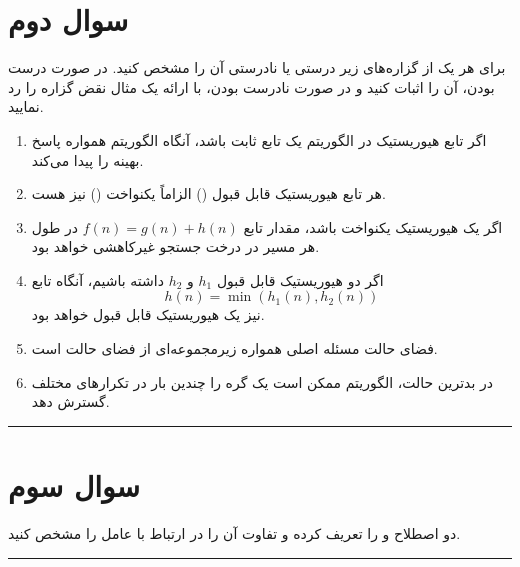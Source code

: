 \documentclass[a4paper,10pt]{article}
\begin{document}
\section{\textcolor{AccentGold}{سوال دوم}}

برای هر یک از گزاره‌های زیر درستی یا نادرستی آن را مشخص کنید.  
در صورت درست بودن، آن را اثبات کنید و در صورت نادرست بودن، با ارائه یک مثال نقض گزاره را رد نمایید.

\begin{enumerate}
	
	\item
	اگر تابع هیوریستیک در الگوریتم  یک تابع ثابت باشد، آنگاه الگوریتم همواره پاسخ بهینه را پیدا می‌کند.
	
	\item
	هر تابع هیوریستیک قابل قبول () الزاماً یکنواخت () نیز هست.
	
	\item
	اگر یک هیوریستیک یکنواخت باشد، مقدار تابع $f(n)=g(n)+h(n)$ در طول هر مسیر در درخت جستجو غیرکاهشی خواهد بود.
	
	\item
	اگر دو هیوریستیک قابل قبول $h_1$ و $h_2$ داشته باشیم، آنگاه تابع
	\[
	h(n)=\min(h_1(n),h_2(n))
	\]
	نیز یک هیوریستیک قابل قبول خواهد بود.
	
	\item
	فضای حالت مسئله اصلی همواره زیرمجموعه‌ای از فضای حالت  است.
	
	\item
	در بدترین حالت، الگوریتم  ممکن است یک گره را چندین بار در تکرارهای مختلف گسترش دهد.
	
\end{enumerate}

\bigskip
\textcolor{AccentCyan}{\rule{\linewidth}{0.4pt}}



\section{\textcolor{AccentGold}{سوال سوم}}
دو اصطلاح  و  را تعریف کرده و تفاوت آن را در ارتباط با عامل را مشخص کنید.

\bigskip
\bigskip
\textcolor{AccentCyan}{\rule{\linewidth}{0.4pt}}
\end{document}
